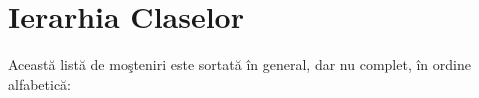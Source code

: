 \section{Ierarhia Claselor}
Această listă de moşteniri este sortată în general, dar nu complet, în ordine alfabetică\+:\begin{DoxyCompactList}
\item {}
\item {}
\begin{DoxyCompactList}
\item {}
\item {}
\item {}
\end{DoxyCompactList}
\item {}
\end{DoxyCompactList}
